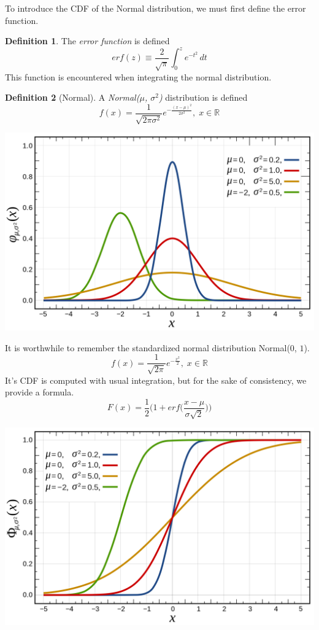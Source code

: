 \documentclass{article}
\theoremstyle{remark}
\theoremstyle{definition}
\newtheorem{definition}{Definition}[section]
\begin{document}
To introduce the CDF of the Normal distribution, we must first define the error function. 

\begin{definition}
The \textit{error function} is defined
\[erf (z) \equiv \frac{2}{\sqrt{\pi}} \int_0^z e^{-t^2} \, dt\]
This function is encountered when integrating the normal distribution. 
\end{definition}

\begin{definition}[Normal]
A \textit{Normal($\mu$, $\sigma^2$)} distribution is defined
\[f(x) = \frac{1}{\sqrt{2 \pi \sigma^2}} e^{-\frac{(x-\mu)^2}{2\sigma^2}}, \; x \in \mathbb{R}\]
\begin{center}
    \includegraphics[scale=0.15]{img/Normal_Distribution_Model.png}
\end{center}
It is worthwhile to remember the standardized normal distribution Normal($0$, $1$).
\[f(x) = \frac{1}{\sqrt{2\pi}} e^{-\frac{x^2}{2}}, \; x \in \mathbb{R}\]
It's CDF is computed with usual integration, but for the sake of consistency, we provide a formula. 
\[F(x) = \frac{1}{2} \bigg(1 + erf\Big(\frac{x-\mu}{\sigma \sqrt{2}}\Big) \bigg)\]
\begin{center}
    \includegraphics[scale=0.15]{img/Normal_Distribution_Model_2.png}
\end{center}
\end{definition}
\end{document}

